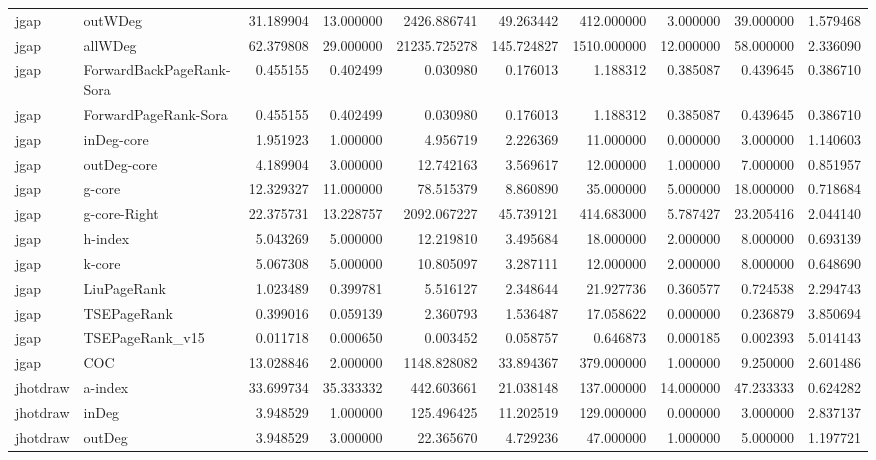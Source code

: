 \begin{tabular}{llrrrrrrrr}
jgap & outWDeg & 31.189904 & 13.000000 & 2426.886741 & 49.263442 & 412.000000 & 3.000000 & 39.000000 & 1.579468 \\
jgap & allWDeg & 62.379808 & 29.000000 & 21235.725278 & 145.724827 & 1510.000000 & 12.000000 & 58.000000 & 2.336090 \\
jgap & ForwardBackPageRank-Sora & 0.455155 & 0.402499 & 0.030980 & 0.176013 & 1.188312 & 0.385087 & 0.439645 & 0.386710 \\
jgap & ForwardPageRank-Sora & 0.455155 & 0.402499 & 0.030980 & 0.176013 & 1.188312 & 0.385087 & 0.439645 & 0.386710 \\
jgap & inDeg-core & 1.951923 & 1.000000 & 4.956719 & 2.226369 & 11.000000 & 0.000000 & 3.000000 & 1.140603 \\
jgap & outDeg-core & 4.189904 & 3.000000 & 12.742163 & 3.569617 & 12.000000 & 1.000000 & 7.000000 & 0.851957 \\
jgap & g-core & 12.329327 & 11.000000 & 78.515379 & 8.860890 & 35.000000 & 5.000000 & 18.000000 & 0.718684 \\
jgap & g-core-Right & 22.375731 & 13.228757 & 2092.067227 & 45.739121 & 414.683000 & 5.787427 & 23.205416 & 2.044140 \\
jgap & h-index & 5.043269 & 5.000000 & 12.219810 & 3.495684 & 18.000000 & 2.000000 & 8.000000 & 0.693139 \\
jgap & k-core & 5.067308 & 5.000000 & 10.805097 & 3.287111 & 12.000000 & 2.000000 & 8.000000 & 0.648690 \\
jgap & LiuPageRank & 1.023489 & 0.399781 & 5.516127 & 2.348644 & 21.927736 & 0.360577 & 0.724538 & 2.294743 \\
jgap & TSEPageRank & 0.399016 & 0.059139 & 2.360793 & 1.536487 & 17.058622 & 0.000000 & 0.236879 & 3.850694 \\
jgap & TSEPageRank_v15 & 0.011718 & 0.000650 & 0.003452 & 0.058757 & 0.646873 & 0.000185 & 0.002393 & 5.014143 \\
jgap & COC & 13.028846 & 2.000000 & 1148.828082 & 33.894367 & 379.000000 & 1.000000 & 9.250000 & 2.601486 \\
jhotdraw & a-index & 33.699734 & 35.333332 & 442.603661 & 21.038148 & 137.000000 & 14.000000 & 47.233333 & 0.624282 \\
jhotdraw & inDeg & 3.948529 & 1.000000 & 125.496425 & 11.202519 & 129.000000 & 0.000000 & 3.000000 & 2.837137 \\
jhotdraw & outDeg & 3.948529 & 3.000000 & 22.365670 & 4.729236 & 47.000000 & 1.000000 & 5.000000 & 1.197721 \\

\end{tabular}

